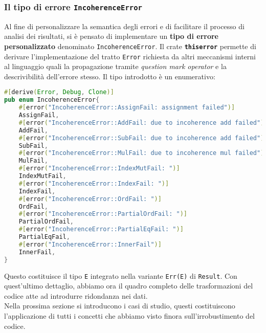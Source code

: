 \subsubsection{Il tipo di errore \texttt{IncoherenceError}}
Al fine di personalizzare la semantica degli errori e di facilitare il processo di analisi dei risultati, si è pensato di implementare un \textbf{tipo di errore personalizzato} denominato \texttt{IncoherenceError}. Il crate \textbf{\texttt{thiserror}} permette di derivare l'implementazione del tratto \texttt{Error} richiesta da altri meccanismi interni al linguaggio quali la propagazione tramite \textit{question mark operator} e la descrivibilità dell'errore stesso. Il tipo introdotto è un enumerativo: 

\begin{lstlisting}[language=Rust, style=boxed]
#[derive(Error, Debug, Clone)]
pub enum IncoherenceError{
    #[error("IncoherenceError::AssignFail: assignment failed")]
    AssignFail,
    #[error("IncoherenceError::AddFail: due to incoherence add failed")]
    AddFail,
    #[error("IncoherenceError::SubFail: due to incoherence add failed")]
    SubFail,
    #[error("IncoherenceError::MulFail: due to incoherence mul failed")]
    MulFail,
    #[error("IncoherenceError::IndexMutFail: ")]
    IndexMutFail,
    #[error("IncoherenceError::IndexFail: ")]
    IndexFail,
    #[error("IncoherenceError::OrdFail: ")]
    OrdFail,
    #[error("IncoherenceError::PartialOrdFail: ")]
    PartialOrdFail,
    #[error("IncoherenceError::PartialEqFail: ")]
    PartialEqFail,
    #[error("IncoherenceError::InnerFail")]
    InnerFail,
}
\end{lstlisting}
Questo costituisce il tipo \texttt{E} integrato nella variante \texttt{Err(E)} di \texttt{Result}. Con quest'ultimo dettaglio, abbiamo ora il quadro completo delle trasformazioni del codice atte ad introdurre ridondanza nei dati. \\
Nella prossima sezione si introducono i casi di studio, questi costituiscono l'applicazione di tutti i concetti che abbiamo visto finora sull'irrobustimento del codice.

